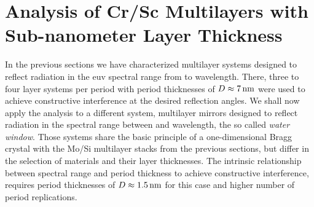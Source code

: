 \section{Analysis of Cr/Sc Multilayers with Sub-nanometer Layer Thickness} \label{ch_spec:sec_CrSc}
In the previous sections we have characterized multilayer systems designed to reflect radiation in the \gls{euv} spectral range from  to  wavelength. There, three to four layer systems per period with period thicknesses of $D\approx\nm{7}$ were used to achieve constructive interference at the desired reflection angles. We shall now apply the analysis to a different system, multilayer mirrors designed to reflect radiation in the spectral range between  and  wavelength, the so called \emph{water window}. Those systems share the basic principle of a one-dimensional Bragg crystal with the Mo/Si multilayer stacks from the previous sections, but differ in the selection of materials and their layer thicknesses. The intrinsic relationship between spectral range and period thickness to achieve constructive interference, requires period thicknesses of $D\approx \nm{1.5}$ for this case and higher number of period replications.


